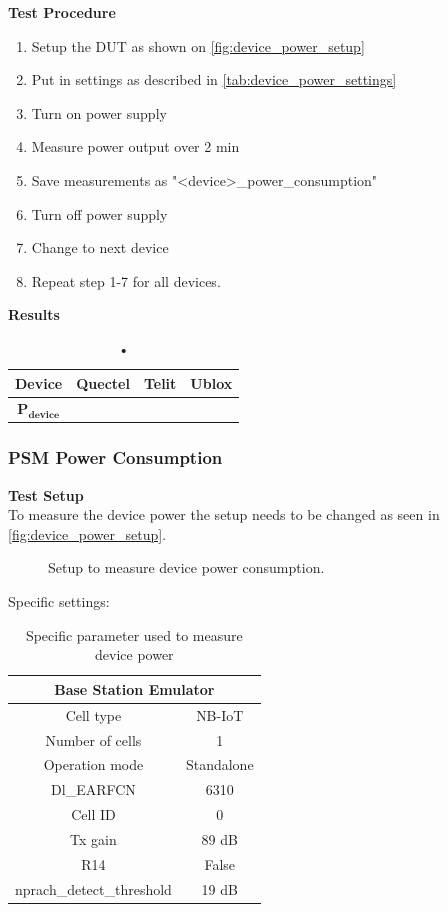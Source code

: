 \textbf{Test Procedure}\\
\begin{enumerate}
\item Setup the \gls{DUT} as shown on \autoref{fig:device_power_setup}
\item Put in settings as described in \autoref{tab:device_power_settings} 
\item Turn on power supply 
\item Measure power output over 2 min
\item Save measurements as "<device>\_power\_consumption"
\item Turn off power supply
\item Change to next device
\item Repeat step 1-7 for all devices.
\end{enumerate}

\textbf{Results}\\
\begin{table}[H]
\centering
\begin{tabular}{|c|c|c|c|}\hline
\textbf{Device}	& Quectel	& Telit & Ublox \\ \hline
$\mathbf{P_{device}}$	& & & \\ \hline
\end{tabular}
\caption{•}
\label{tab:device_power_results}
\end{table}

\subsubsection{\gls{PSM} Power Consumption}
\textbf{Test Setup}\\
To measure the device power the setup needs to be changed as seen in \autoref{fig:device_power_setup}.
\begin{figure}[H]
\centering
{}
\caption{Setup to measure device power consumption.}
\label{fig:device_power_setup}
\end{figure}

Specific settings:
\begin{table}[H]
\centering
\begin{tabular}{|c|c|} \hline
\multicolumn{2}{|c|}{\textbf{Base Station Emulator}} \\ \hline
Cell type          & NB-IoT         \\ \hline
Number of cells    & 1              \\ \hline
Operation mode     & Standalone     \\ \hline
Dl\_EARFCN         & 6310           \\ \hline
Cell ID            & 0              \\ \hline
Tx gain            & 89 dB          \\ \hline
R14                & False          \\ \hline
nprach\_detect\_threshold  & 19 dB  \\ \hline
\end{tabular}
\caption{Specific parameter used to measure device power}
\label{tab:device_power_settings}
\end{table}


